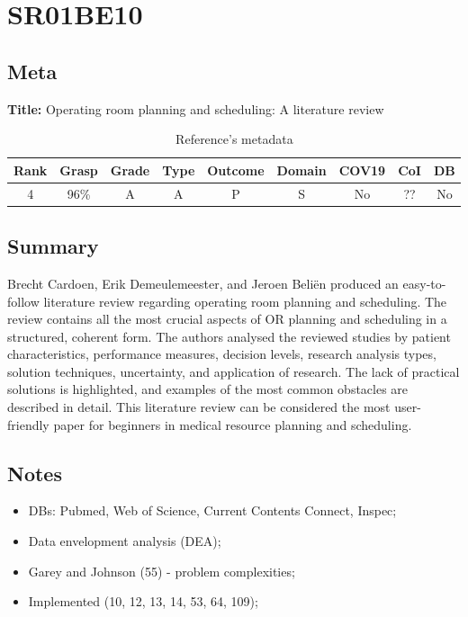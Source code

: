 \section{ SR01BE10 }


\subsection{Meta}

    \textbf{Title:}
    Operating room planning and scheduling: A literature review

    \begin{table}[H]
        \centering
        \begin{tabular}{|c|c|c|c|c|c|c|c|c|}
            \hline
                \textbf{Rank} & \textbf{Grasp} & \textbf{Grade} & \textbf{Type} & \textbf{Outcome} & \textbf{Domain} & \textbf{COV19} & \textbf{CoI} & \textbf{DB} \\
            \hline
                4 & 96\% & A & A & P & S & No & ?? & No \\
            \hline
        \end{tabular}
        \caption{Reference's metadata}
        \label{tab:SR01BE10}
    \end{table}

\subsection{Summary}
    Brecht Cardoen, Erik Demeulemeester, and Jeroen Beliën \cite{x228} produced an easy-to-follow literature review regarding operating room planning and scheduling. The review contains all the most crucial aspects of OR planning and scheduling in a structured, coherent form. The authors analysed the reviewed studies by patient characteristics, performance measures, decision levels, research analysis types, solution techniques, uncertainty, and application of research. The lack of practical solutions is highlighted, and examples of the most common obstacles are described in detail. This literature review can be considered the most user-friendly paper for beginners in medical resource planning and scheduling.

\subsection{Notes}
    \begin{itemize}
        \item DBs: Pubmed, Web of Science, Current Contents Connect, Inspec;
        \item Data envelopment analysis (DEA);
        \item Garey and Johnson (55) - problem complexities;
        \item Implemented (10, 12, 13, 14, 53, 64, 109);
    \end{itemize}


